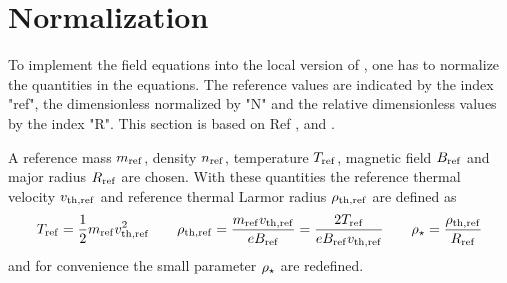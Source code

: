 \section{Normalization}
\label{sec:normalizationLocal}

To implement the field equations into the local version of {\gkw}, one has to normalize the quantities in the equations. The reference values are indicated by the index "ref", the dimensionless normalized by "N" and the relative dimensionless values by the index "R". This section is based on Ref ,  and .
\bigskip

A reference mass $m_\mathrm{ref}$, density $n_\mathrm{ref}$, temperature $T_\mathrm{ref}$, magnetic field $B_\mathrm{ref}$ and major radius $R_\mathrm{ref}$ are chosen. With these quantities the reference thermal velocity $v_{\mathrm{th},\mathrm{ref}}$ and reference thermal Larmor radius $\rho_{\mathrm{th},\mathrm{ref}}$ are defined as
\begin{gather*}
    T_\mathrm{ref} = \frac{1}{2} m_\mathrm{ref} v_{\mathrm{th},\mathrm{ref}}^2 \qquad \rho_{\mathrm{th},\mathrm{ref}} = \frac{m_\mathrm{ref} v_{\mathrm{th},\mathrm{ref}}}{e B_\mathrm{ref}} = \frac{2 T_\mathrm{ref}}{e B_\mathrm{ref} v_{\mathrm{th},\mathrm{ref}}} \qquad  \rho_\star = \frac{\rho_{\mathrm{th},\mathrm{ref}}}{R_\mathrm{ref}}
\end{gather*}
and for convenience the small parameter $\rho_\star$ are redefined.
\bigskip


